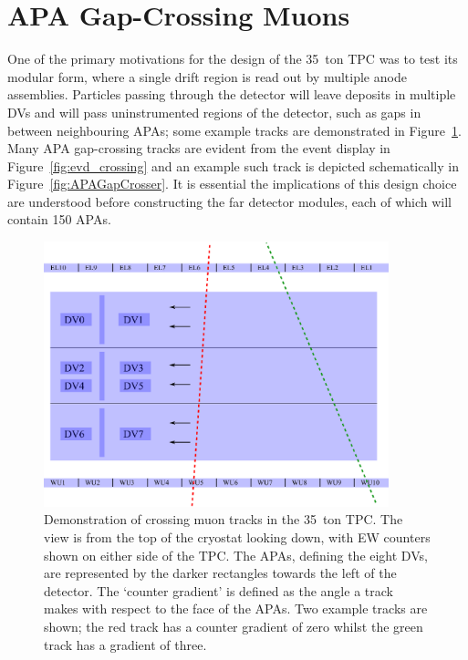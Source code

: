 \section{APA Gap-Crossing Muons}\label{sec:APAGapCrossing}

One of the primary motivations for the design of the 35~ton TPC was to test its modular form, where a single drift region is read out by multiple anode assemblies.  Particles passing through the detector will leave deposits in multiple DVs and will pass uninstrumented regions of the detector, such as gaps in between neighbouring APAs; some example tracks are demonstrated in Figure~\ref{fig:35tonCounters}.  Many APA gap-crossing tracks are evident from the event display in Figure~\ref{fig:evd_crossing} and an example such track is depicted schematically in Figure~\ref{fig:APAGapCrosser}.  It is essential the implications of this design choice are understood before constructing the far detector modules, each of which will contain 150 APAs.

\begin{figure}
  \centering
  \includegraphics[width=10cm]{CounterGradient.eps}
  \caption[Demonstration of crossing muons tracks in the 35~ton TPC.]{Demonstration of crossing muon tracks in the 35~ton TPC.  The view is from the top of the cryostat looking down, with EW counters shown on either side of the TPC.  The APAs, defining the eight DVs, are represented by the darker rectangles towards the left of the detector.  The `counter gradient' is defined as the angle a track makes with respect to the face of the APAs.  Two example tracks are shown; the red track has a counter gradient of zero whilst the green track has a gradient of three.}
  \label{fig:35tonCounters}
\end{figure}

